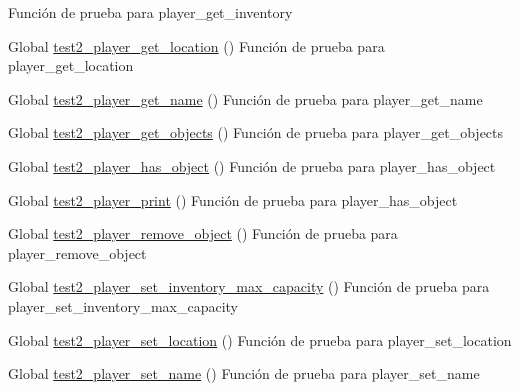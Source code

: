 \begin{DoxyRefList}
%
Función de prueba para player\+\_\+get\+\_\+inventory  
\item[Global \mbox{\hyperlink{player__test_8c_a4c5605fac4bd716e1dfb2744db4fa8a1}{test2\+\_\+player\+\_\+get\+\_\+location}} ()]\label{test__test000148}%
%
Función de prueba para player\+\_\+get\+\_\+location  
\item[Global \mbox{\hyperlink{player__test_8c_a3aa908fd360b74e7786422260e8e16a0}{test2\+\_\+player\+\_\+get\+\_\+name}} ()]\label{test__test000132}%
%
Función de prueba para player\+\_\+get\+\_\+name  
\item[Global \mbox{\hyperlink{player__test_8c_a08d3ba426b306cc9e9e766deef6e038d}{test2\+\_\+player\+\_\+get\+\_\+objects}} ()]\label{test__test000137}%
%
Función de prueba para player\+\_\+get\+\_\+objects  
\item[Global \mbox{\hyperlink{player__test_8c_ae8953d45d8f555a930dbc8aba101d399}{test2\+\_\+player\+\_\+has\+\_\+object}} ()]\label{test__test000150}%
%
Función de prueba para player\+\_\+has\+\_\+object  
\item[Global \mbox{\hyperlink{player__test_8c_a46b5c792a37831e8c142d4c32b9767f7}{test2\+\_\+player\+\_\+print}} ()]\label{test__test000158}%
%
Función de prueba para player\+\_\+has\+\_\+object  
\item[Global \mbox{\hyperlink{player__test_8c_af9e74e12ad6961761f1ff61afa56be3e}{test2\+\_\+player\+\_\+remove\+\_\+object}} ()]\label{test__test000142}%
%
Función de prueba para player\+\_\+remove\+\_\+object  
\item[Global \mbox{\hyperlink{player__test_8c_a25f52636fb912ac120d40e17f70554fb}{test2\+\_\+player\+\_\+set\+\_\+inventory\+\_\+max\+\_\+capacity}} ()]\label{test__test000155}%
%
Función de prueba para player\+\_\+set\+\_\+inventory\+\_\+max\+\_\+capacity  
\item[Global \mbox{\hyperlink{player__test_8c_a2c702753d9e2e3df9ef4abf2d1b9bc8d}{test2\+\_\+player\+\_\+set\+\_\+location}} ()]\label{test__test000145}%
%
Función de prueba para player\+\_\+set\+\_\+location  
\item[Global \mbox{\hyperlink{player__test_8c_a6e7ce8ff791f4bf63749df647a44263f}{test2\+\_\+player\+\_\+set\+\_\+name}} ()]\label{test__test000129}%
%
Función de prueba para player\+\_\+set\+\_\+name  

\end{DoxyRefList}
